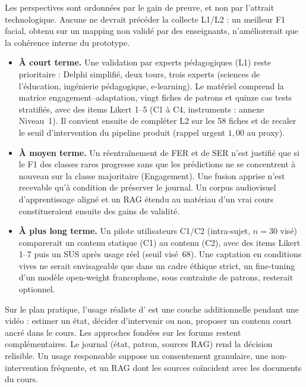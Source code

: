 Les perspectives sont ordonnées par le gain de preuve, et non par
l'attrait technologique. Aucune ne devrait précéder la collecte L1/L2 :
un meilleur F1 facial, obtenu sur un mapping non validé par des
enseignants, n'améliorerait que la cohérence interne du prototype.

\begin{itemize}[leftmargin=1.4em]
  \item \textbf{À court terme.} Une validation par experts pédagogiques
  (L1) reste prioritaire : Delphi simplifié, deux tours, trois experts
  (sciences de l'éducation, ingénierie pédagogique, e-learning). Le
  matériel comprend la matrice engagement--adaptation, vingt fiches de
  patrons et quinze cas tests stratifiés, avec des items Likert 1--5
  (C1 à C4, instruments : annexe Niveau~1). Il convient ensuite de
  compléter L2 sur les 58 fiches et de recaler le seuil d'intervention
  du pipeline produit (rappel urgent $1{,}00$ au proxy).

  \item \textbf{À moyen terme.} Un réentraînement de FER et de SER
  n'est justifié que si le F1 des classes rares progresse sans que les
  prédictions ne se concentrent à nouveau sur la classe majoritaire
  (Engagement). Une fusion apprise n'est recevable qu'à condition de
  préserver le journal. Un corpus audiovisuel d'apprentissage aligné
  et un RAG étendu au matériau d'un vrai cours constitueraient ensuite
  des gains de validité.

  \item \textbf{À plus long terme.} Un pilote utilisateurs C1/C2
  (intra-sujet, $n=30$ visé) comparerait un contenu statique (C1) au
  contenu \emolearn{} (C2), avec des items Likert 1--7 puis un SUS
  après usage réel (seuil visé~$68$). Une captation en conditions
  vives ne serait envisageable que dans un cadre éthique strict, 
  un fine-tuning d'un modèle open-weight francophone, sous contrainte
  de patrons, resterait optionnel.
\end{itemize}

Sur le plan pratique, l'usage réaliste d'\emolearn{} est une couche
additionnelle pendant une vidéo : estimer un état, décider d'intervenir
ou non, proposer un contenu court ancré dans le cours. Les approches
fondées sur les forums restent complémentaires. Le journal (état,
patron, sources RAG) rend la décision relisible. Un usage responsable
suppose un consentement granulaire, une non-intervention fréquente, et
un RAG dont les sources coïncident avec les documents du cours.

